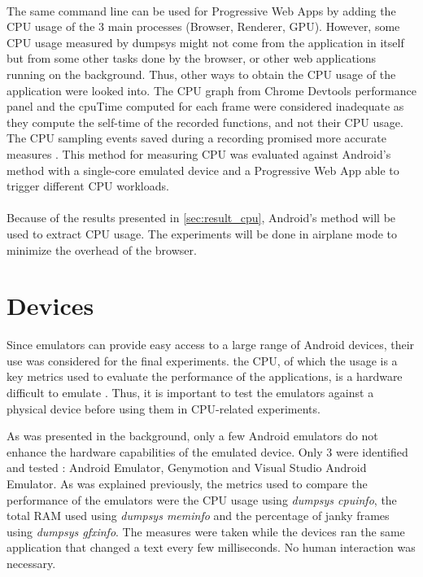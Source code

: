 \documentclass{kththesis}
\begin{document}
\paragraph{}
The same command line can be used for Progressive Web Apps by adding the CPU usage of the 3 main processes (Browser, Renderer, GPU). 
However, some CPU usage measured by dumpsys might not come from the application in itself but from some other tasks done by the browser, or other web applications running on the background. 
Thus, other ways to obtain the CPU usage of the application were looked into.
The CPU graph from Chrome Devtools performance panel and the cpuTime computed for each frame were considered inadequate as they compute the self-time of the recorded functions, and not their CPU usage. The CPU sampling events saved during a recording promised more accurate measures \cite{cpu_sampling}. This method for measuring CPU was evaluated against Android's method with a single-core emulated device and a Progressive Web App able to trigger different CPU workloads. \newline

\paragraph{}
Because of the results presented in \autoref{sec:result_cpu}, Android's method will be used to extract CPU usage. The experiments will be done in airplane mode to minimize the overhead of the browser. 




\section{Devices}
\label{method:emulators}

Since emulators can provide easy access to a large range of Android devices, their use was considered for the final experiments. the CPU, of which the usage is a key metrics used to evaluate the performance of the applications, is a hardware difficult to emulate \cite{cpu_emulator}. Thus, it is important to test the emulators against a physical device before using them in CPU-related experiments.

As was presented in the background, only a few Android emulators do not enhance the hardware capabilities of the emulated device. Only 3 were identified and tested : Android Emulator, Genymotion and Visual Studio Android Emulator. As was explained previously, the metrics used to compare the performance of the emulators were the CPU usage using \textit{dumpsys cpuinfo}, the total RAM used using \textit{dumpsys meminfo} and the percentage of janky frames using \textit{dumpsys gfxinfo}. The measures were taken while the devices ran the same application that changed a text every few milliseconds. No human interaction was necessary. \newline
\end{document}
